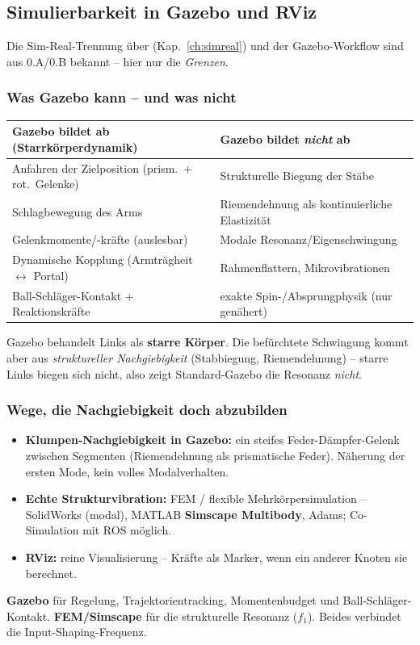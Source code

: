\subsection{Simulierbarkeit in Gazebo und RViz}
Die Sim-Real-Trennung über  (Kap.~\ref{ch:simreal}) und der
Gazebo-Workflow sind aus 0.A/0.B bekannt -- hier nur die \emph{Grenzen}.
\subsubsection{Was Gazebo kann -- und was nicht}
\begin{longtable}{@{}p{7.4cm}p{7.2cm}@{}}
\toprule
\textbf{Gazebo bildet ab (Starrkörperdynamik)} & \textbf{Gazebo bildet \emph{nicht} ab} \\
\midrule
Anfahren der Zielposition (prism.\ + rot.\ Gelenke) & Strukturelle Biegung der Stäbe \\
Schlagbewegung des Arms      & Riemendehnung als kontinuierliche Elastizität \\
Gelenkmomente/-kräfte (auslesbar) & Modale Resonanz/Eigenschwingung \\
Dynamische Kopplung (Armträgheit $\leftrightarrow$ Portal) & Rahmenflattern, Mikrovibrationen \\
Ball-Schläger-Kontakt + Reaktionskräfte & exakte Spin-/Absprungphysik (nur genähert) \\
\bottomrule
\end{longtable}
\begin{warnbox}[title=Der Kernpunkt]
Gazebo behandelt Links als \textbf{starre Körper}. Die befürchtete Schwingung
kommt aber aus \emph{struktureller Nachgiebigkeit} (Stabbiegung, Riemendehnung)
-- starre Links biegen sich nicht, also zeigt Standard-Gazebo die Resonanz
\emph{nicht}.
\end{warnbox}
\subsubsection{Wege, die Nachgiebigkeit doch abzubilden}
\begin{itemize}
\item \textbf{Klumpen-Nachgiebigkeit in Gazebo:} ein steifes Feder-Dämpfer-Gelenk
  zwischen Segmenten (Riemendehnung als prismatische Feder). Näherung der ersten
  Mode, kein volles Modalverhalten.
\item \textbf{Echte Strukturvibration:} FEM / flexible Mehrkörpersimulation --
  SolidWorks (modal), MATLAB \textbf{Simscape Multibody}, Adams; Co-Simulation
  mit ROS möglich.
\item \textbf{RViz:} reine Visualisierung -- Kräfte als Marker, wenn ein anderer
  Knoten sie berechnet.
\end{itemize}
\begin{infobox}[title=Empfohlene Aufteilung]
\textbf{Gazebo} für Regelung, Trajektorientracking, Momentenbudget und
Ball-Schläger-Kontakt. \textbf{FEM/Simscape} für die strukturelle Resonanz
($f_1$). Beides verbindet die Input-Shaping-Frequenz.
\end{infobox}

